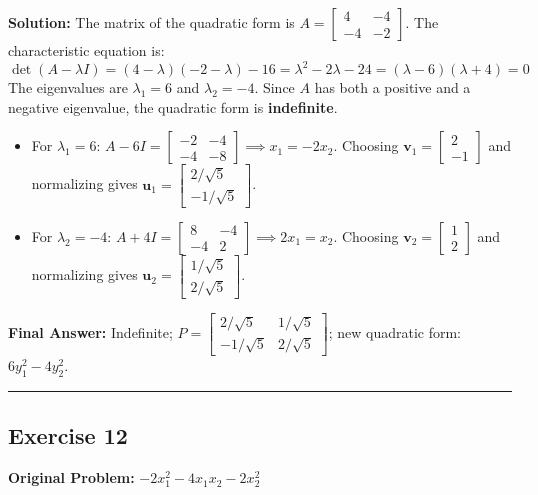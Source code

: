 \documentclass[11pt, letterpaper]{article}
\theoremstyle{definition}
\theoremstyle{remark}
\begin{document}
\textbf{Solution:}
The matrix of the quadratic form is $A = \begin{bmatrix} 4 & -4 \\ -4 & -2 \end{bmatrix}$.
The characteristic equation is:
\[
\det(A - \lambda I) = (4 - \lambda)(-2 - \lambda) - 16 = \lambda^2 - 2\lambda - 24 = (\lambda - 6)(\lambda + 4) = 0
\]
The eigenvalues are $\lambda_1 = 6$ and $\lambda_2 = -4$. Since $A$ has both a positive and a negative eigenvalue, the quadratic form is \textbf{indefinite}.
\begin{itemize}
    \item For $\lambda_1 = 6$: $A - 6I = \begin{bmatrix} -2 & -4 \\ -4 & -8 \end{bmatrix} \implies x_1 = -2x_2$. Choosing $\mathbf{v}_1 = \begin{bmatrix} 2 \\ -1 \end{bmatrix}$ and normalizing gives $\mathbf{u}_1 = \begin{bmatrix} 2/\sqrt{5} \\ -1/\sqrt{5} \end{bmatrix}$.
    \item For $\lambda_2 = -4$: $A + 4I = \begin{bmatrix} 8 & -4 \\ -4 & 2 \end{bmatrix} \implies 2x_1 = x_2$. Choosing $\mathbf{v}_2 = \begin{bmatrix} 1 \\ 2 \end{bmatrix}$ and normalizing gives $\mathbf{u}_2 = \begin{bmatrix} 1/\sqrt{5} \\ 2/\sqrt{5} \end{bmatrix}$.
\end{itemize}
\textbf{Final Answer:} Indefinite; $P = \begin{bmatrix} 2/\sqrt{5} & 1/\sqrt{5} \\ -1/\sqrt{5} & 2/\sqrt{5} \end{bmatrix}$; new quadratic form: $6y_1^2 - 4y_2^2$.

\medskip\hrule\medskip

\subsection*{Exercise 12}
\textbf{Original Problem:} $-2x_1^2 - 4x_1x_2 - 2x_2^2$
\end{document}
